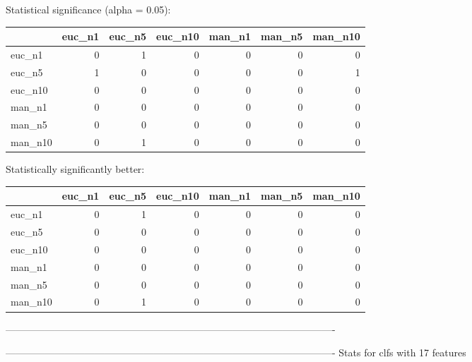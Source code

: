 Statistical significance (alpha = 0.05):
 \begin{tabular}{lrrrrrr}
\hline
         &   euc\_n1 &   euc\_n5 &   euc\_n10 &   man\_n1 &   man\_n5 &   man\_n10 \\
\hline
 euc\_n1  &        0 &        1 &         0 &        0 &        0 &         0 \\
 euc\_n5  &        1 &        0 &         0 &        0 &        0 &         1 \\
 euc\_n10 &        0 &        0 &         0 &        0 &        0 &         0 \\
 man\_n1  &        0 &        0 &         0 &        0 &        0 &         0 \\
 man\_n5  &        0 &        0 &         0 &        0 &        0 &         0 \\
 man\_n10 &        0 &        1 &         0 &        0 &        0 &         0 \\
\hline
\end{tabular} 

Statistically significantly better:
 \begin{tabular}{lrrrrrr}
\hline
         &   euc\_n1 &   euc\_n5 &   euc\_n10 &   man\_n1 &   man\_n5 &   man\_n10 \\
\hline
 euc\_n1  &        0 &        1 &         0 &        0 &        0 &         0 \\
 euc\_n5  &        0 &        0 &         0 &        0 &        0 &         0 \\
 euc\_n10 &        0 &        0 &         0 &        0 &        0 &         0 \\
 man\_n1  &        0 &        0 &         0 &        0 &        0 &         0 \\
 man\_n5  &        0 &        0 &         0 &        0 &        0 &         0 \\
 man\_n10 &        0 &        1 &         0 &        0 &        0 &         0 \\
\hline
\end{tabular} 

----------------------------------------------------------------------------------------------------



----------------------------------------------------------------------------------------------------
Stats for clfs with 17 features


